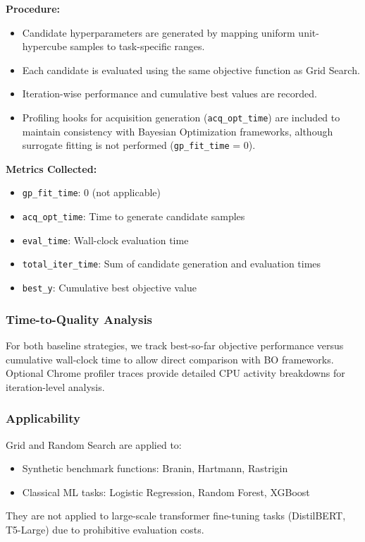 \documentclass[11pt]{article}
\begin{document}
\textbf{Procedure:}
\begin{itemize}
    \item Candidate hyperparameters are generated by mapping uniform unit-hypercube samples to task-specific ranges.
    \item Each candidate is evaluated using the same objective function as Grid Search.
    \item Iteration-wise performance and cumulative best values are recorded.
    \item Profiling hooks for acquisition generation (\texttt{acq\_opt\_time}) are included to maintain consistency with Bayesian Optimization frameworks, although surrogate fitting is not performed (\texttt{gp\_fit\_time} = 0).
\end{itemize}

\textbf{Metrics Collected:}
\begin{itemize}
    \item \texttt{gp\_fit\_time}: 0 (not applicable)
    \item \texttt{acq\_opt\_time}: Time to generate candidate samples
    \item \texttt{eval\_time}: Wall-clock evaluation time
    \item \texttt{total\_iter\_time}: Sum of candidate generation and evaluation times
    \item \texttt{best\_y}: Cumulative best objective value
\end{itemize}

\subsubsection{Time-to-Quality Analysis}
For both baseline strategies, we track best-so-far objective performance versus cumulative wall-clock time to allow direct comparison with BO frameworks. Optional Chrome profiler traces provide detailed CPU activity breakdowns for iteration-level analysis.

\subsubsection{Applicability}
Grid and Random Search are applied to:
\begin{itemize}
    \item Synthetic benchmark functions: Branin, Hartmann, Rastrigin
    \item Classical ML tasks: Logistic Regression, Random Forest, XGBoost
\end{itemize}
They are not applied to large-scale transformer fine-tuning tasks (DistilBERT, T5-Large) due to prohibitive evaluation costs.
\end{document}
